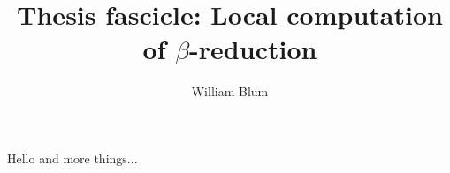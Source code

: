 


\author{William Blum}
\title{Thesis fascicle: Local computation of $\beta$-reduction}



    \maketitle
    \tableofcontents
\clearpage

    Hello and more things...
    

    
    



\printtodomargin